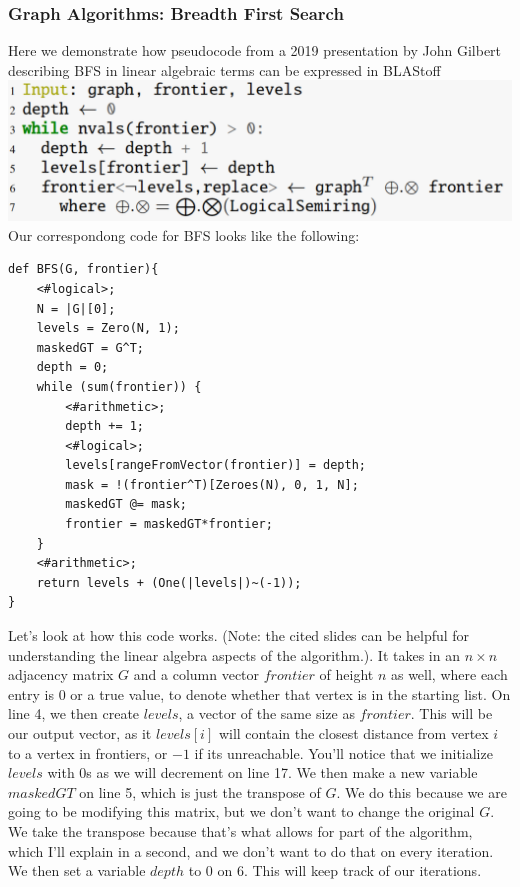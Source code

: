 \subsubsection{Graph Algorithms: Breadth First Search}
Here we demonstrate how pseudocode from a 2019 presentation by John Gilbert describing BFS in linear algebraic terms \cite{Gilbert} can be expressed in BLAStoff\\
\includegraphics[scale=0.4]{figures/graphBLAS BFS pseudocode.png}\\
Our correspondong code for BFS looks like the following:
\begin{lstlisting}
def BFS(G, frontier){
    <#logical>;
    N = |G|[0];
    levels = Zero(N, 1);
    maskedGT = G^T;
    depth = 0;
    while (sum(frontier)) {
        <#arithmetic>;
        depth += 1;
        <#logical>;
        levels[rangeFromVector(frontier)] = depth;
        mask = !(frontier^T)[Zeroes(N), 0, 1, N];
        maskedGT @= mask;
        frontier = maskedGT*frontier;
    }
    <#arithmetic>;
    return levels + (One(|levels|)~(-1));
}
\end{lstlisting}
Let's look at how this code works.  (Note: the cited slides can be helpful for understanding the linear algebra aspects of the algorithm.). It takes in an $n\times n$ adjacency matrix $G$ and a column vector $frontier$ of height $n$ as well, where each entry is 0 or a true value, to denote whether that vertex is in the starting list.  On line 4, we then create $levels$, a vector of the same size as $frontier$.  This will be our output vector, as it $levels[i]$ will contain the closest distance from vertex $i$ to a vertex in frontiers, or $-1$ if its unreachable.   You'll notice that we initialize $levels$ with 0s as we will decrement on line 17.  We then make a new variable $maskedGT$ on line 5, which is just the transpose of $G$.  We do this because we are going to be modifying this matrix, but we don't want to change the original $G$.  We take the transpose because that's what allows for part of the algorithm, which I'll explain in a second, and we don't want to do that on every iteration. We then set a variable $depth$ to 0 on 6.  This will keep track of our iterations.

